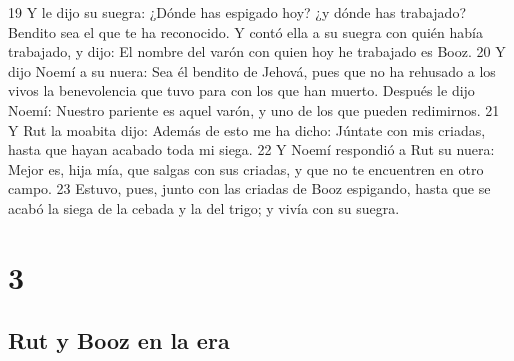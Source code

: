 19 Y le dijo su suegra: ¿Dónde has espigado hoy? ¿y dónde has trabajado? Bendito sea el que te ha reconocido. Y contó ella a su suegra con quién había trabajado, y dijo: El nombre del varón con quien hoy he trabajado es Booz.
20 Y dijo Noemí a su nuera: Sea él bendito de Jehová, pues que no ha rehusado a los vivos la benevolencia que tuvo para con los que han muerto. Después le dijo Noemí: Nuestro pariente es aquel varón, y uno de los que pueden redimirnos.
21 Y Rut la moabita dijo: Además de esto me ha dicho: Júntate con mis criadas, hasta que hayan acabado toda mi siega.
22 Y Noemí respondió a Rut su nuera: Mejor es, hija mía, que salgas con sus criadas, y que no te encuentren en otro campo.
23 Estuvo, pues, junto con las criadas de Booz espigando, hasta que se acabó la siega de la cebada y la del trigo; y vivía con su suegra.

\chapter{3}

\section*{Rut y Booz en la era}

